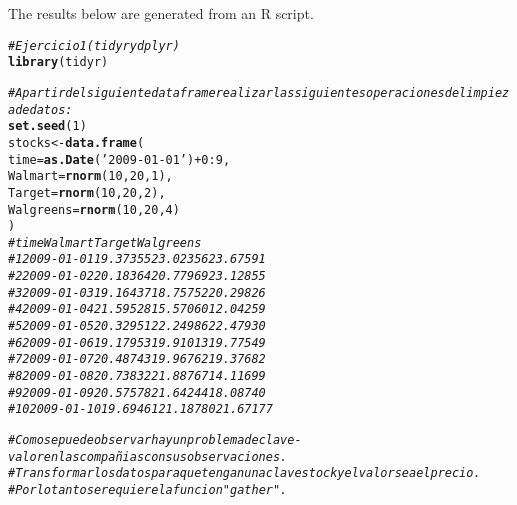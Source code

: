 \documentclass{article}\usepackage[]{graphicx}\usepackage[]{xcolor}
\makeatletter
\newcommand{\hlnum}[1]{\textcolor[rgb]{0.686,0.059,0.569}{#1}}%
\newcommand{\hlstr}[1]{\textcolor[rgb]{0.192,0.494,0.8}{#1}}%
\newcommand{\hlcom}[1]{\textcolor[rgb]{0.678,0.584,0.686}{\textit{#1}}}%
\newcommand{\hlopt}[1]{\textcolor[rgb]{0,0,0}{#1}}%
\newcommand{\hlstd}[1]{\textcolor[rgb]{0.345,0.345,0.345}{#1}}%
\newcommand{\hlkwb}[1]{\textcolor[rgb]{0.69,0.353,0.396}{#1}}%
\newcommand{\hlkwc}[1]{\textcolor[rgb]{0.333,0.667,0.333}{#1}}%
\newcommand{\hlkwd}[1]{\textcolor[rgb]{0.737,0.353,0.396}{\textbf{#1}}}%
\newenvironment{kframe}{%
 \def\at@end@of@kframe{}%
 \ifinner\ifhmode%
  \def\at@end@of@kframe{\end{minipage}}%
  \begin{minipage}{\columnwidth}%
 \fi\fi%
 \def\FrameCommand##1{\hskip\@totalleftmargin \hskip-\fboxsep
 \colorbox{shadecolor}{##1}\hskip-\fboxsep
     \hskip-\linewidth \hskip-\@totalleftmargin \hskip\columnwidth}%
 \MakeFramed {\advance\hsize-\width
   \@totalleftmargin\z@ \linewidth\hsize
   \@setminipage}}%
 {\par\unskip\endMakeFramed%
 \at@end@of@kframe}
\newenvironment{knitrout}{}{} %
\makeatother
\begin{document}
\title{}



\maketitle
The results below are generated from an R script.

\begin{knitrout}
\color{fgcolor}\begin{kframe}
\begin{alltt}
\hlcom{# Ejercicio 1 (tidyr y dplyr)}
\hlkwd{library}\hlstd{(tidyr)}
\end{alltt}


{\ttfamily\noindent\itshape\color{messagecolor}{\#\# \\\#\# Attaching package: 'tidyr'}}

{\ttfamily\noindent\itshape\color{messagecolor}{\#\# The following objects are masked from 'package:Matrix':\\\#\# \\\#\# \ \ \ \ expand, pack, unpack}}\begin{alltt}
\hlcom{# A partir del siguiente dataframe realizar las siguientes operaciones de limpieza de datos:}
\hlkwd{set.seed}\hlstd{(}\hlnum{1}\hlstd{)}
\hlstd{stocks} \hlkwb{<-} \hlkwd{data.frame}\hlstd{(}
  \hlkwc{time} \hlstd{=} \hlkwd{as.Date}\hlstd{(}\hlstr{'2009-01-01'}\hlstd{)} \hlopt{+} \hlnum{0}\hlopt{:}\hlnum{9}\hlstd{,}
  \hlkwc{Walmart} \hlstd{=} \hlkwd{rnorm}\hlstd{(}\hlnum{10}\hlstd{,} \hlnum{20}\hlstd{,} \hlnum{1}\hlstd{),}
  \hlkwc{Target} \hlstd{=} \hlkwd{rnorm}\hlstd{(}\hlnum{10}\hlstd{,} \hlnum{20}\hlstd{,} \hlnum{2}\hlstd{),}
  \hlkwc{Walgreens} \hlstd{=} \hlkwd{rnorm}\hlstd{(}\hlnum{10}\hlstd{,} \hlnum{20}\hlstd{,} \hlnum{4}\hlstd{)}
\hlstd{)}
\hlcom{#       time  Walmart   Target Walgreens}
\hlcom{# 1  2009-01-01 19.37355 23.02356  23.67591}
\hlcom{# 2  2009-01-02 20.18364 20.77969  23.12855}
\hlcom{# 3  2009-01-03 19.16437 18.75752  20.29826}
\hlcom{# 4  2009-01-04 21.59528 15.57060  12.04259}
\hlcom{# 5  2009-01-05 20.32951 22.24986  22.47930}
\hlcom{# 6  2009-01-06 19.17953 19.91013  19.77549}
\hlcom{# 7  2009-01-07 20.48743 19.96762  19.37682}
\hlcom{# 8  2009-01-08 20.73832 21.88767  14.11699}
\hlcom{# 9  2009-01-09 20.57578 21.64244  18.08740}
\hlcom{# 10 2009-01-10 19.69461 21.18780  21.67177}

\hlcom{# Como se puede observar hay un problema de clave-valor en las compañias con sus observaciones.}
\hlcom{# Transformar los datos para que tengan una clave stock y el valor sea el precio. }
\hlcom{# Por lo tanto se requiere la funcion "gather".}


\end{alltt}
\end{kframe}
\end{knitrout}
\end{document}
